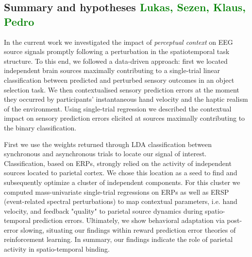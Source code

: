 \subsection{Summary and hypotheses \textcolor{green}{Lukas, Sezen, Klaus, Pedro}}
In the current work we investigated the impact of \textit{perceptual context} on EEG source signals promptly following a perturbation in the spatiotemporal task structure. To this end, we followed a data-driven approach: first we located independent brain sources maximally contributing to a single-trial linear classification between predicted and perturbed sensory outcomes in an object selection task. We then contextualised sensory prediction errors at the moment they occurred by participants' instantaneous hand velocity and the haptic realism of the environment. Using single-trial regression we described the contextual impact on sensory prediction errors elicited at sources maximally contributing to the binary classification.

First we use the weights returned through LDA classification between synchronous and asynchronous trials to locate our signal of interest. Classification, based on ERPs, strongly relied on the activity of independent sources located to parietal cortex. We chose this location as a seed to find and subsequently optimize a cluster of independent components. For this cluster we computed mass-univariate single-trial regressions on ERPs as well as ERSP (event-related spectral perturbations) to map contextual parameters, i.e. hand velocity, and feedback "quality" to parietal source dynamics during spatio-temporal prediction errors. Ultimately, we show behavioral adaptation via post-error slowing, situating our findings within reward prediction error theories of reinforcement learning. In summary, our findings indicate the role of parietal activity in spatio-temporal binding.



